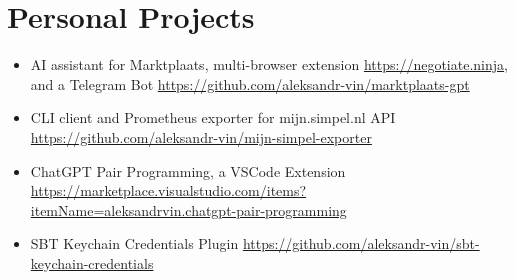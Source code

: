 \section*{Personal Projects}

\begin{itemize}[noitemsep, nosep]
  \item AI assistant for Marktplaats, multi-browser extension \href{https://negotiate.ninja}{\url{https://negotiate.ninja}}, and a Telegram Bot
  \href{https://github.com/aleksandr-vin/marktplaats-gpt}{\url{https://github.com/aleksandr-vin/marktplaats-gpt}}
  \item CLI client and Prometheus exporter for mijn.simpel.nl API
  \href{https://github.com/aleksandr-vin/mijn-simpel-exporter}{\url{https://github.com/aleksandr-vin/mijn-simpel-exporter}}
  \item ChatGPT Pair Programming, a VSCode Extension
  \href{https://marketplace.visualstudio.com/items?itemName=aleksandrvin.chatgpt-pair-programming}{\url{https://marketplace.visualstudio.com/items?itemName=aleksandrvin.chatgpt-pair-programming}}
  \item SBT Keychain Credentials Plugin
  \href{https://github.com/aleksandr-vin/sbt-keychain-credentials}{\url{https://github.com/aleksandr-vin/sbt-keychain-credentials}}
\end{itemize}
